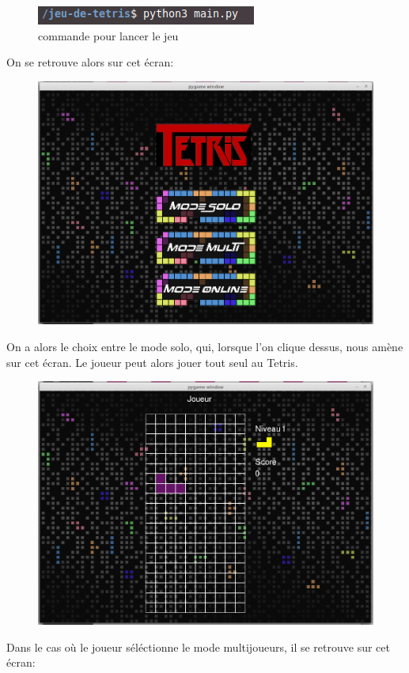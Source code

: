 \documentclass[a4paper, 11pt]{article}
\begin{document}
            \begin{figure}[ht]
                \centering
                \includegraphics[scale=0.75]{images/lanceMain.png}
                \caption{commande pour lancer le jeu}
            \end{figure}
            
            On se retrouve alors sur cet écran: 
            
            \begin{figure}[ht]
                \centering
                \includegraphics[scale=0.25]{images/ecran1.png}
            \end{figure}
            On a alors le choix entre le mode solo, qui, lorsque l'on clique dessus, nous amène sur cet écran. Le joueur peut alors jouer tout seul au Tetris.
            
            \begin{figure}[ht]
                \centering
                \includegraphics[scale=0.25]{images/jeuSolo.png}
            \end{figure}
            \newpage
            Dans le cas où le joueur séléctionne le mode multijoueurs, il se retrouve sur cet écran:
            
\end{document}
